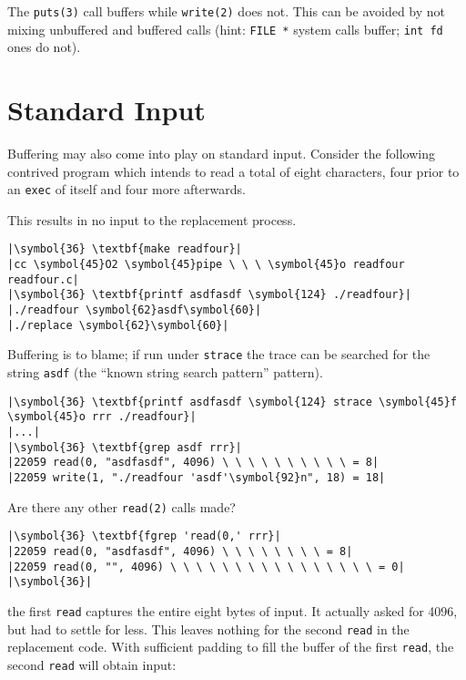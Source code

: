 \documentclass[10pt,a4paper]{article}
\begin{document}
The \texttt{puts(3)} call buffers while \texttt{write(2)} does not. This
can be avoided by not mixing unbuffered and buffered calls (hint:
\texttt{FILE *} system calls buffer; \texttt{int fd} ones do not).

\section*{Standard Input}

Buffering may also come into play on standard input. Consider the
following contrived program which intends to read a total of eight
characters, four prior to an \texttt{exec} of itself and four more
afterwards.



This results in no input to the replacement process.

\begin{lstlisting}
|\symbol{36} \textbf{make readfour}|
|cc \symbol{45}O2 \symbol{45}pipe \ \ \ \symbol{45}o readfour readfour.c|
|\symbol{36} \textbf{printf asdfasdf \symbol{124} ./readfour}|
|./readfour \symbol{62}asdf\symbol{60}|
|./replace \symbol{62}\symbol{60}|
\end{lstlisting}

Buffering is to blame; if run under \texttt{strace} the trace can be
searched for the string \texttt{asdf} (the ``known string search
pattern'' pattern).

\begin{lstlisting}
|\symbol{36} \textbf{printf asdfasdf \symbol{124} strace \symbol{45}f \symbol{45}o rrr ./readfour}|
|...|
|\symbol{36} \textbf{grep asdf rrr}|
|22059 read(0, "asdfasdf", 4096) \ \ \ \ \ \ \ \ \ \ = 8|
|22059 write(1, "./readfour 'asdf'\symbol{92}n", 18) = 18|
\end{lstlisting}

Are there any other \texttt{read(2)} calls made?

\begin{lstlisting}
|\symbol{36} \textbf{fgrep 'read(0,' rrr}|
|22059 read(0, "asdfasdf", 4096) \ \ \ \ \ \ \ \ = 8|
|22059 read(0, "", 4096) \ \ \ \ \ \ \ \ \ \ \ \ \ \ \ \ = 0|
|\symbol{36}|
\end{lstlisting}

the first \texttt{read} captures the entire eight bytes of input. It
actually asked for 4096, but had to settle for less. This leaves nothing
for the second \texttt{read} in the replacement code. With sufficient
padding to fill the buffer of the first \texttt{read}, the second
\texttt{read} will obtain input:
\end{document}
